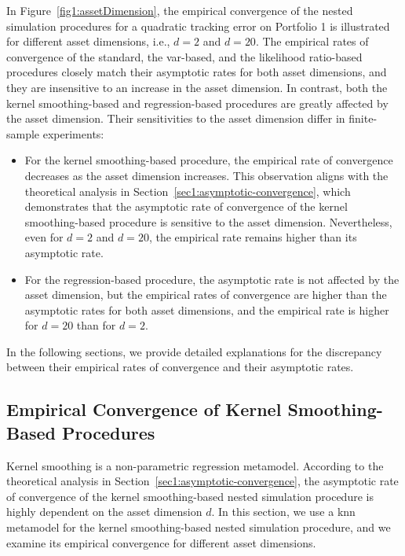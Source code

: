 In Figure~\ref{fig1:assetDimension}, the empirical convergence of the nested simulation procedures for a quadratic tracking error on Portfolio 1 is illustrated for different asset dimensions, i.e., $d = 2$ and $d = 20$.
The empirical rates of convergence of the standard, the \gls{var}-based, and the likelihood ratio-based procedures closely match their asymptotic rates for both asset dimensions, and they are insensitive to an increase in the asset dimension.
In contrast, both the kernel smoothing-based and regression-based procedures are greatly affected by the asset dimension.
Their sensitivities to the asset dimension differ in finite-sample experiments:
\begin{itemize}    
    \item For the kernel smoothing-based procedure, the empirical rate of convergence decreases as the asset dimension increases. 
    This observation aligns with the theoretical analysis in Section~\ref{sec1:asymptotic-convergence}, which demonstrates that the asymptotic rate of convergence of the kernel smoothing-based procedure is sensitive to the asset dimension.
    Nevertheless, even for $d = 2$ and $d = 20$, the empirical rate remains higher than its asymptotic rate.
    \item For the regression-based procedure, the asymptotic rate is not affected by the asset dimension, but the empirical rates of convergence are higher than the asymptotic rates for both asset dimensions, and the empirical rate is higher for $d = 20$ than for $d = 2$.
\end{itemize}
In the following sections, we provide detailed explanations for the discrepancy between their empirical rates of convergence and their asymptotic rates.

\subsection{Empirical Convergence of Kernel Smoothing-Based Procedures}\label{sec1:kernel-smoothing-convergence}

Kernel smoothing is a non-parametric regression metamodel.
According to the theoretical analysis in Section~\ref{sec1:asymptotic-convergence}, the asymptotic rate of convergence of the kernel smoothing-based nested simulation procedure is highly dependent on the asset dimension $d$.
In this section, we use a \gls{knn} metamodel for the kernel smoothing-based nested simulation procedure, and we examine its empirical convergence for different asset dimensions.

